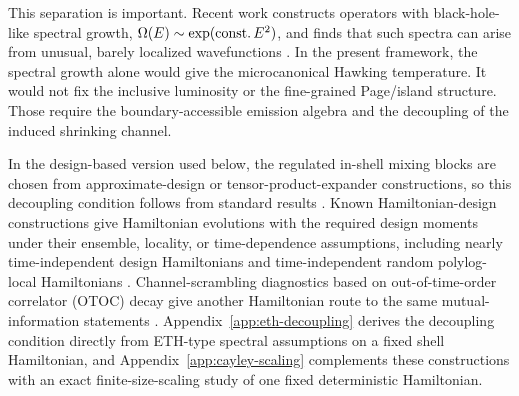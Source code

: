 \documentclass[12pt]{article}
\begin{document}
This separation is important.  Recent work constructs operators with
black-hole-like spectral growth, $\Omega(E)\sim\exp({\rm const.}\,E^2)$, and
finds that such spectra can arise from unusual, barely localized wavefunctions
\cite{AurellMajumdar2025}.  In the present framework, the spectral growth alone
would give the microcanonical Hawking temperature.  It would not fix the
inclusive luminosity or the fine-grained Page/island structure.  Those require
the boundary-accessible emission algebra and the decoupling of the induced
shrinking channel.

In the design-based version used below, the regulated
in-shell mixing blocks are chosen from approximate-design or
tensor-product-expander constructions, so this decoupling condition follows
from standard results
\cite{HaydenPreskill2007,HaydenHorodeckiWinterYard2008,
DankertCleveEmersonLivine2009,SzehrDupuisTomamichelRenner2013,
BrownFawzi2015,HarrowLow2009}.  Known Hamiltonian-design constructions give
Hamiltonian evolutions with the required design moments under their ensemble,
locality, or time-dependence assumptions, including nearly time-independent
design Hamiltonians and time-independent random polylog-local Hamiltonians
\cite{NakataHircheKoashiWinter2017,CuiSchusterMaoHuangBrandao2025}.
Channel-scrambling diagnostics based on out-of-time-order correlator (OTOC)
decay give another Hamiltonian route to the same mutual-information statements
\cite{HosurQiRobertsYoshida2016,YoshidaKitaev2017}.
Appendix~\ref{app:eth-decoupling} derives the decoupling condition directly
from ETH-type spectral assumptions on a fixed shell Hamiltonian, and
Appendix~\ref{app:cayley-scaling} complements these constructions
with an exact finite-size-scaling study of one fixed deterministic
Hamiltonian.
\end{document}
